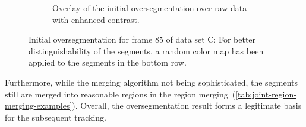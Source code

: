 \begin{figure}
\begin{subfigure}[t]{0.48\textwidth}
        \caption{Overlay of the initial oversegmentation over raw data with enhanced contrast.}
    \end{subfigure}
    \caption[Initial oversegmentation for frame $85$ of data set C]{Initial oversegmentation for
        frame $85$ of data set C: For better distinguishability of the segments, a random color map
        has been applied to the segments in the bottom row.}
    \label{fig:joint-experiment-overseg-b}
\end{figure}
Furthermore, while the merging algorithm not being sophisticated, the segments still are merged into
reasonable regions in the region merging~(\cf \cref{tab:joint-region-merging-examples}). Overall, the oversegmentation result forms
a legitimate basis for the subsequent tracking.
